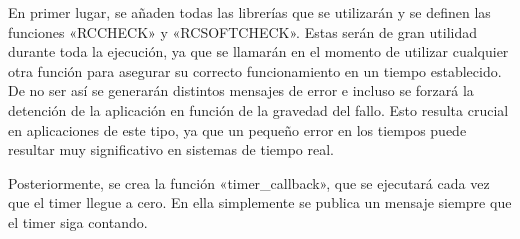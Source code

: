 \documentclass[a4paper,11pt,spanish]{sphinxmanual}
\begin{document}
\begin{sphinxVerbatim}[commandchars=\\\{\},formatcom=\footnotesize]
           
      
      

      

         

     

\end{sphinxVerbatim}

\sphinxAtStartPar
En primer lugar, se añaden todas las librerías que se utilizarán y se definen
las funciones «RCCHECK» y «RCSOFTCHECK». Estas serán de gran utilidad durante
toda la ejecución, ya que se llamarán en el momento de utilizar cualquier otra
función para asegurar su correcto funcionamiento en un tiempo establecido.
De no ser así se generarán distintos mensajes de error e incluso se forzará
la detención de la aplicación en función de la gravedad del fallo. Esto resulta
crucial en aplicaciones de este tipo, ya que un pequeño error en los tiempos
puede resultar muy significativo en sistemas de tiempo real.

\sphinxAtStartPar
Posteriormente, se crea la función «timer\_callback», que se ejecutará
cada vez que el timer llegue a cero. En ella simplemente se publica un mensaje
siempre que el timer siga contando.
\end{document}
